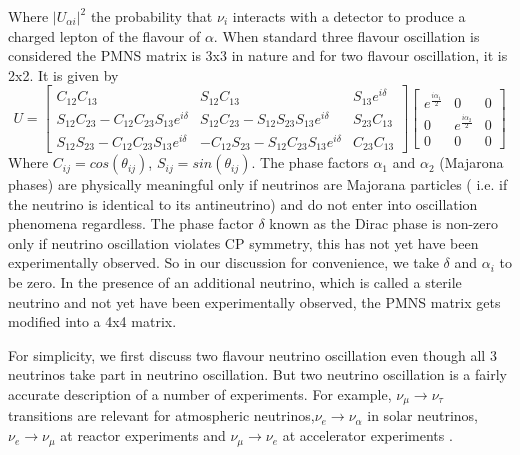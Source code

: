 \documentclass[12pt,a4paper]{report}
\begin{document}
Where $|U_{\alpha i}|^{2}$ the probability that $\nu_{i}$ interacts with a detector to produce a charged lepton of the flavour of $\alpha$. When standard three flavour oscillation is considered the PMNS matrix is 3x3 in nature and for two flavour oscillation, it is 2x2. It is given by
\begin{equation}
\label{eq:0c}
U = \begin{bmatrix} C_{12}C_{13} & S_{12}C_{13} & S_{13}e^{i\delta} \\
S_{12}C_{23}-C_{12}C_{23}S_{13}e^{i\delta} & S_{12}C_{23}-S_{12}S_{23}S_{13}e^{i\delta}& S_{23}C_{13}\\
S_{12}S_{23}-C_{12}C_{23}S_{13}e^{i\delta}& -C_{12}S_{23}-S_{12}C_{23}S_{13}e^{i\delta}&C_{23}C_{13} \end{bmatrix} \begin{bmatrix}
e^{\frac{i\alpha_{1}}{2}}&0&0\\0& e^{\frac{i\alpha_{2}}{2}}&0\\0&0&0\end{bmatrix}
\end{equation}
Where $C_{ij}=cos(\theta_{ij})$, $S_{ij}=sin(\theta_{ij})$. The phase factors $\alpha_{1}$ and $\alpha_{2}$ (Majarona phases) are physically meaningful only if neutrinos are Majorana particles ( i.e. if the neutrino is identical to its antineutrino) and do not enter into oscillation phenomena regardless. The phase factor $\delta$ known as the Dirac phase is non-zero only if neutrino oscillation violates CP symmetry, this has not yet have been experimentally observed. So in our discussion for convenience, we take $\delta$ and $\alpha_{i}$ to be zero. In the presence of an additional neutrino, which is called a sterile neutrino and not yet have been experimentally observed, the PMNS matrix gets modified into a 4x4 matrix.\par

For simplicity, we first discuss two flavour neutrino oscillation even though all 3 neutrinos take part in neutrino oscillation. But two neutrino oscillation is a fairly accurate description of a number of experiments. For example, $\nu_{\mu} \rightarrow \nu_{\tau}$ transitions are relevant for atmospheric neutrinos,$\nu_{e}\rightarrow \nu_{\alpha}$ in solar neutrinos, $\nu_{e}\rightarrow\nu_{\mu}$  at reactor experiments and $\nu_{\mu} \rightarrow \nu_{e}$ at accelerator experiments \cite{Blasome}.\par
\end{document}
